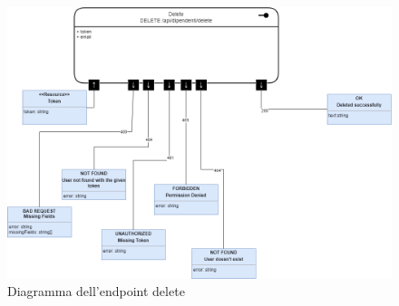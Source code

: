 \documentclass{report}
\begin{document}
\begin{figure}[H]
	\centering\includegraphics[width=1\textwidth]{images/microservizio-dipendenti/diagrams/delete_diagram.drawio.png}
	\caption{Diagramma dell'endpoint delete}
\end{figure}
\end{document}
